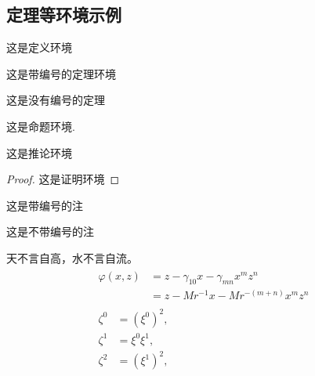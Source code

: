 \documentclass[twoside,doctor]{zjnuthesis}
\begin{document}
\subsection{定理等环境示例}

\begin{definition}
  这是定义环境
\end{definition}

\begin{theorem}
  这是带编号的定理环境
\end{theorem}

\begin{theorem*}
  这是没有编号的定理
\end{theorem*}
\begin{proposition}
  这是命题环境.
\end{proposition}

\begin{corollary}
  这是推论环境
\end{corollary}

\begin{proof}
  这是证明环境
\end{proof}

\begin{remark}
  这是带编号的注
\end{remark}

\begin{remark*}
  这是不带编号的注
\end{remark*}

\begin{proposition}
  天不言自高，水不言自流。
  \begin{gather*}
    \begin{split} 
      \varphi(x,z)
      &=z-\gamma_{10}x-\gamma_{mn}x^mz^n\\
      &=z-Mr^{-1}x-Mr^{-(m+n)}x^mz^n
    \end{split}\\[6pt]
    \begin{align} \zeta^0&=(\xi^0)^2,\\
      \zeta^1 &=\xi^0\xi^1,\\
      \zeta^2 &=(\xi^1)^2,
    \end{align}
  \end{gather*}
\end{proposition}
\end{document}
